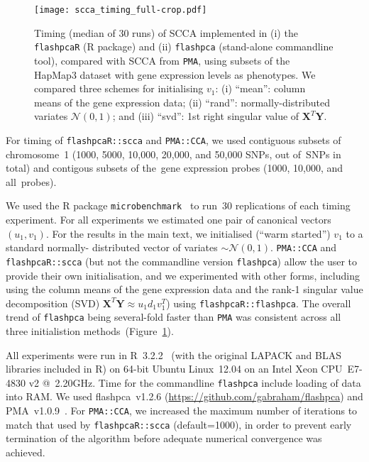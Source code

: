 \documentclass[a4paper,12pt]{article}
\begin{document}
\begin{figure}[!tpb]
\centering
\texttt{[image: scca\_timing\_full-crop.pdf]}
\caption{
Timing (median of 30 runs) of SCCA implemented in (i) the \texttt{flashpcaR}
(\textsf{R} package) and (ii) \texttt{flashpca} (stand-alone commandline tool),
compared with SCCA from \texttt{PMA}, using subsets of the HapMap3 dataset with gene
expression levels as phenotypes. We compared three schemes for initialising
$v_1$: (i) ``mean'': column means of the gene expression data; (ii) ``rand'':
normally-distributed variates $\mathcal{N}(0, 1)$; and (iii) ``svd'': 1st
right singular value of $\mathbf{X}^T \mathbf{Y}$.
}
\label{fig:s01}
\end{figure}

For timing of \texttt{flashpcaR::scca} and \texttt{PMA::CCA}, we used contiguous
subsets of chromosome~1 (1000, 5000, 10,000, 20,000, and 50,000 SNPs, out
of~\ngenes SNPs in total) and contigous subsets of the~\ngenes gene expression
probes (1000, 10,000, and all~\ngenes probes).

We used the \textsf{R} package \texttt{microbenchmark}~\citep{Mersmann2015}
to run~30 replications of each timing experiment.  For all experiments we
estimated one pair of canonical vectors $(u_1, v_1)$.  For the results in the
main text, we initialised (``warm started'') $v_1$ to a standard normally-
distributed vector of variates $\sim\mathcal{N}(0,1)$. \texttt{PMA::CCA} and
\texttt{flashpcaR::scca} (but not the commandline version \texttt{flashpca})
allow the user to provide their own initialisation, and we experimented with
other forms, including using the column means of the gene expression data
and the rank-1 singular value decomposition (SVD) $\mathbf{X}^T \mathbf{Y}
\approx u_1 d_1 v_1^T$) using \texttt{flashpcaR::flashpca}. The overall
trend of \texttt{flashpca} being several-fold faster than \texttt{PMA}
was consistent across all three initialistion methods~(Figure~\ref{fig:s01}).

All experiments were run in \textsf{R}~3.2.2~\citep{R} (with the original
LAPACK and BLAS libraries included in \textsf{R}) on 64-bit Ubuntu Linux~12.04
on an Intel Xeon CPU~E7-4830 v2 @~2.20GHz. Time for the commandline
\texttt{flashpca} include loading of data into RAM. We used flashpca~v1.2.6
(\url{https://github.com/gabraham/flashpca}) and PMA~v1.0.9~\citep{Witten2013}.
For \texttt{PMA::CCA}, we increased the maximum number of iterations to match
that used by \texttt{flashpcaR::scca} (default=1000), in order to prevent
early termination of the algorithm before adequate numerical convergence was
achieved. 
\end{document}
